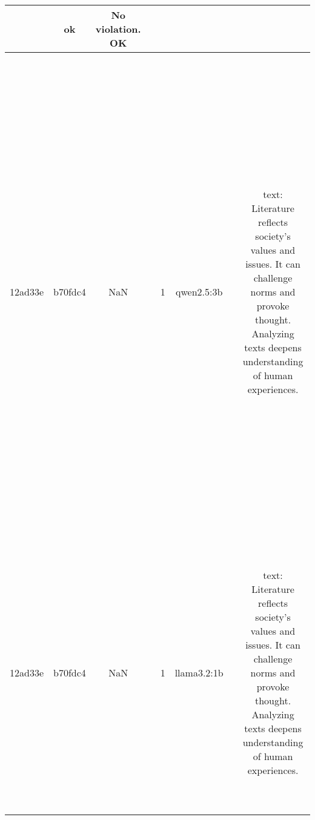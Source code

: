 \begin{table}[h!]
\begin{tabular}{|c|c|c|c|c|c|c|c|c|c|c|}
 & ok & No violation.
OK\\
\hline
12ad33e & b70fdc4 & NaN &  & 1 & qwen2.5:3b &  & text: Literature reflects society's values and issues. It can challenge norms and provoke thought. Analyzing texts deepens understanding of human experiences. & ```html
<p><strong>Literature</strong> reflects <em>society's</em> values and <em>issues</em>. It can challenge <em>norms</em> and <em>provoke</em> thought. Analyzing texts deepens understanding of human <em>experiences</em>.</p>
<p><strong>Literature</strong> reflects <em>society's</em> values and <em>issues</em>. It can challenge <em>norms</em> and <em>provoke</em> thought. Analyzing texts deepens understanding of human <em>experiences</em>.</p>
```

Note: Given the repetition in your provided text, I have only formatted one paragraph with emphasis applied to specific keywords and phrases within each sentence. If you need this information repeated or structured differently, please let me know! & err & The chatbot output contains only two `<p>` tags, whereas the description explicitly requires **at least three `<p>` tags**. This violates the specified requirement for the number of paragraph tags.

ERR\\
\hline
12ad33e & b70fdc4 & NaN &  & 1 & llama3.2:1b &  & text: Literature reflects society's values and issues. It can challenge norms and provoke thought. Analyzing texts deepens understanding of human experiences. & <p> Literature reflects society's values and issues.</p> <strong>Literature</strong> <em>reflects</em> <em>society's</em> <em>values</em> <em>and</em> <em>issues</em>.</p> 

<p> It can challenge norms and provoke thought.</p> 
<strong>It</strong> <em>can</em> <em>challenge</em> <em>norms</em> <em>and</em> <em>provoke</em> <em>thought</em>.</p> 


\end{tabular}
\end{table}
